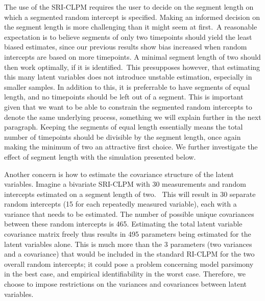 \documentclass[
  man,
  floatsintext,
  longtable,
  nolmodern,
  notxfonts,
  notimes,
  colorlinks=true,linkcolor=blue,citecolor=blue,urlcolor=blue]{apa7}
\begin{document}
The use of the SRI-CLPM requires the user to decide on the segment
length on which a segmented random intercept is specified. Making an
informed decision on the segment length is more challenging than it
might seem at first.~A reasonable expectation is to believe segments of
only two timepoints should yield the least biased estimates, since our
previous results show bias increased when random intercepts are based on
more timepoints. A minimal segment length of two should then work
optimally, if it is identified.~This presupposes however, that
estimating this many latent variables does not introduce unstable
estimation, especially in smaller samples. In addition to this, it is
preferrable to have segments of equal length, and no timepoints should
be left out of a segment. This is important given that we want to be
able to constrain the segmented random intercepts to denote the same
underlying process, something we will explain further in the next
paragraph. Keeping the segments of equal length essentially means the
total number of timepoints should be divisible by the segment length,
once again making the minimum of two an attractive first choice. We
further investigate the effect of segment length with the simulation
presented below.

Another concern is how to estimate the covariance structure of the
latent variables. Imagine a bivariate SRI-CLPM with 30 measurements and
random intercepts estimated on a segment length of two.~ This will
result in 30 separate random intercepts (15 for each repeatedly measured
variable), each with a variance that needs to be estimated. The number
of possible unique covariances between these random intercepts is 465.
Estimating the total latent variable covariance matrix freely thus
results in 495 parameters being estimated for the latent variables
alone. This is much more than the 3 parameters (two variances and a
covariance) that would be included in the standard RI-CLPM for the two
overall random intercepts; it could pose a problem concerning model
parsimony in the best case, and empirical identifiability in the worst
case. Therefore, we choose to impose restrictions on the variances and
covariances between latent variables.
\end{document}
